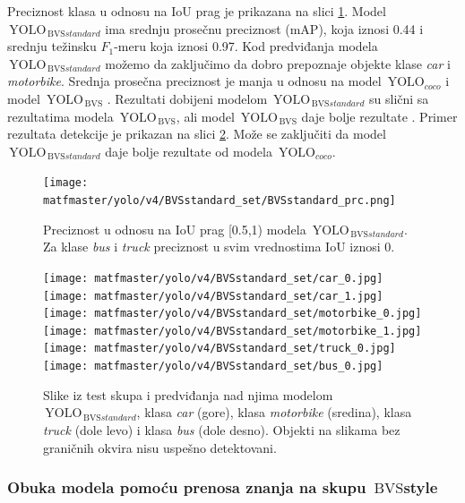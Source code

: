 \documentclass[12pt,oneside]{memoir}
\newcommand{\yolo}{\ensuremath{\,\textrm{YOLO}}}
\newcommand{\bvs}{\ensuremath{\,\textrm{BVS}}}
\begin{document}
\clearpage
Preciznost klasa u odnosu na IoU prag je prikazana na slici \ref{fig:YOLO4_BVSstandard_prc}. Model $\yolo_{\bvs{standard}}$ ima srednju prosečnu preciznost (mAP), koja iznosi 0.44 i srednju težinsku $F_1$-meru koja iznosi 0.97. Kod predviđanja modela  $\yolo_{\bvs{standard}}$ možemo da zaključimo da dobro prepoznaje objekte klase \textit{car} i \textit{motorbike}. Srednja prosečna preciznost je manja u odnosu na model $\yolo_{coco}$ i model $\yolo_{\bvs}$ . Rezultati dobijeni modelom $\yolo_{\bvs{standard}}$ su slični sa rezultatima modela $\yolo_{\bvs}$, ali model $\yolo_{\bvs}$ daje bolje rezultate . Primer rezultata detekcije je prikazan na slici \ref{fig:YOLO4_BVSstandard_predictions}. Može se zaključiti da model $\yolo_{\bvs{standard}}$ daje bolje rezultate od modela $\yolo_{coco}$.


\begin{figure}[!ht]
    \centering
    \texttt{[image: matfmaster/yolo/v4/BVSstandard\_set/BVSstandard\_prc.png]}
    \caption{Preciznost u odnosu na IoU prag [0.5,1) modela $\yolo_{\bvs{standard}}$. Za klase \textit{bus} i \textit{truck} preciznost u svim vrednostima IoU iznosi 0.}
    \label{fig:YOLO4_BVSstandard_prc}
\end{figure}

\begin{figure}[!htbp]
\centering
  \texttt{[image: matfmaster/yolo/v4/BVSstandard\_set/car\_0.jpg]}
  \texttt{[image: matfmaster/yolo/v4/BVSstandard\_set/car\_1.jpg]}
  \texttt{[image: matfmaster/yolo/v4/BVSstandard\_set/motorbike\_0.jpg]}
  \texttt{[image: matfmaster/yolo/v4/BVSstandard\_set/motorbike\_1.jpg]}
  \texttt{[image: matfmaster/yolo/v4/BVSstandard\_set/truck\_0.jpg]}
  \texttt{[image: matfmaster/yolo/v4/BVSstandard\_set/bus\_0.jpg]}
\caption{Slike iz test skupa i predviđanja nad njima modelom  $\yolo_{\bvs{standard}}$, klasa \textit{car} (gore), klasa \textit{motorbike} (sredina), klasa \textit{truck} (dole levo) i klasa \textit{bus} (dole desno). Objekti na slikama bez graničnih okvira nisu uspešno detektovani.}\label{fig:YOLO4_BVSstandard_predictions}
\end{figure}


\clearpage
\subsubsection{Obuka modela pomoću prenosa znanja na skupu \bvs{style}}
\end{document}
